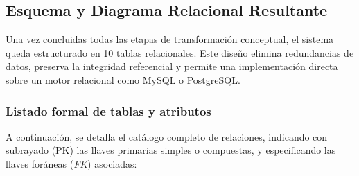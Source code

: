 \subsection{Esquema y Diagrama Relacional Resultante}
\label{subsec:esquema_diagrama_relacional}

Una vez concluidas todas las etapas de transformación conceptual, el sistema queda estructurado en 10 tablas relacionales. Este diseño elimina redundancias de datos, preserva la integridad referencial y permite una implementación directa sobre un motor relacional como MySQL o PostgreSQL.

\subsubsection{Listado formal de tablas y atributos}
A continuación, se detalla el catálogo completo de relaciones, indicando con subrayado (\underline{PK}) las llaves primarias simples o compuestas, y especificando las llaves foráneas (\textit{FK}) asociadas:

